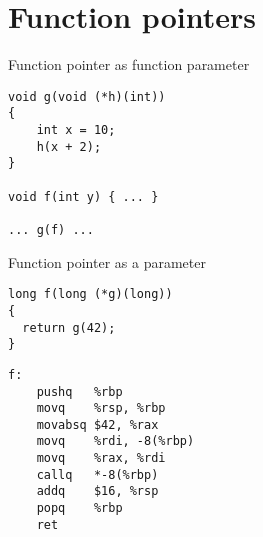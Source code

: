 \documentclass[landscape]{beamer}
\begin{document}
\section{Function pointers}


\begin{frame}[fragile]{Function pointer as function parameter}
\begin{verbatim}
void g(void (*h)(int))
{
    int x = 10;
    h(x + 2);
}
    
void f(int y) { ... }

... g(f) ...
\end{verbatim}

  
\end{frame}   


\begin{frame}[fragile]{Function pointer as a parameter}
\begin{minipage}{.5\textwidth}
\begin{verbatim}
long f(long (*g)(long))
{
  return g(42);
}
\end{verbatim}
\end{minipage}
%
\begin{minipage}{.4\textwidth}
\begin{verbatim}
f:                   
	pushq	%rbp
	movq	%rsp, %rbp
	movabsq	$42, %rax
	movq	%rdi, -8(%rbp)
	movq	%rax, %rdi
	callq	*-8(%rbp)
	addq	$16, %rsp
	popq	%rbp
	ret
\end{verbatim}
\end{minipage}
\end{frame}
\end{document}
